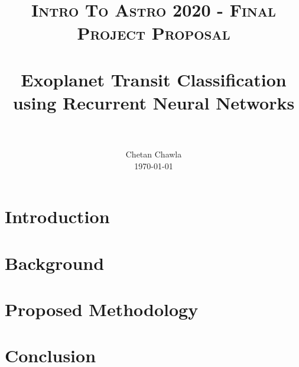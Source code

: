 \documentclass[paper=letterpaper, fontsize=11pt]{scrartcl}
\title{
		\usefont{OT1}{bch}{b}{n}
		\normalfont \normalsize \textsc{Intro To Astro 2020 - Final Project Proposal} \\ [25pt]
		\horrule{0.5pt} \\[0.4cm]
		\huge Exoplanet Transit Classification using Recurrent Neural Networks \\
		\horrule{2pt} \\[0.5cm]
}
\author{
	\normalfont 				\normalsize
        Chetan Chawla	\\		\normalsize
        \today
}
\date{}
\numberwithin{equation}{section}		%
\numberwithin{table}{section}			%
\begin{document}
\maketitle
\vspace{-1.5cm}
\section{Introduction}


\section{Background}


\section{Proposed Methodology}


\section{Conclusion}


%




\end{document}
